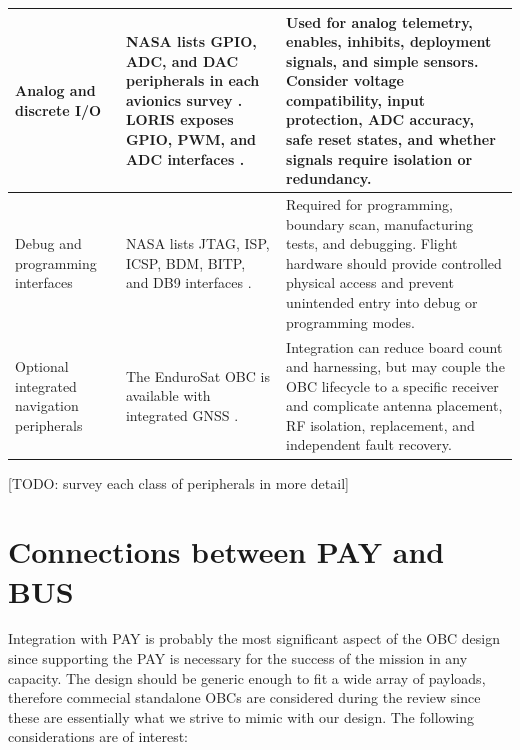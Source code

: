 \documentclass[10pt]{../datasheet}
\let\cite\citep
\begin{document}
\begin{longtable}{|p{3.0cm}|p{6.2cm}|p{6.0cm}|}
  Analog and discrete I/O                                                    &
  NASA lists GPIO, ADC, and DAC peripherals in each avionics survey
  \cite[p.~219]{nasa_soa_2022}
  \cite[p.~235]{nasa_soa_2023}
  \cite[p.~240]{nasa_soa_2024}
  \cite[pp.~224--225]{nasa_soa_2026}.
  LORIS exposes GPIO, PWM, and ADC interfaces
  \cite{loris_obc_pub,loris_obc_nxp}.                                        &
  Used for analog telemetry, enables, inhibits, deployment signals, and simple
  sensors. Consider voltage compatibility, input protection, ADC accuracy,
  safe reset states, and whether signals require isolation or redundancy.
  \\ \hline

  Debug and programming interfaces                                           &
  NASA lists JTAG, ISP, ICSP, BDM, BITP, and DB9 interfaces
  \cite[p.~219]{nasa_soa_2022}
  \cite[p.~235]{nasa_soa_2023}
  \cite[p.~240]{nasa_soa_2024}
  \cite[p.~225]{nasa_soa_2026}.                                              &
  Required for programming, boundary scan, manufacturing tests, and debugging.
  Flight hardware should provide controlled physical access and prevent
  unintended entry into debug or programming modes.                            \\ \hline

  Optional integrated navigation peripherals                                 &
  The EnduroSat OBC is available with integrated GNSS
  \cite[p.~229]{nasa_soa_2023}
  \cite[p.~230]{nasa_soa_2026}.                                              &
  Integration can reduce board count and harnessing, but may couple the OBC
  lifecycle to a specific receiver and complicate antenna placement, RF
  isolation, replacement, and independent fault recovery.                      \\ \hline
\end{longtable}

[TODO: survey each class of peripherals in more detail]

\section{Connections between PAY and BUS}

Integration with PAY is probably the most significant aspect of the OBC design
since supporting the PAY is necessary for the success of the mission in any
capacity. The design should be generic enough to fit a wide array of payloads,
therefore commecial standalone OBCs are considered during the review since these
are essentially what we strive to mimic with our design. The following
considerations are of interest:
\end{document}
